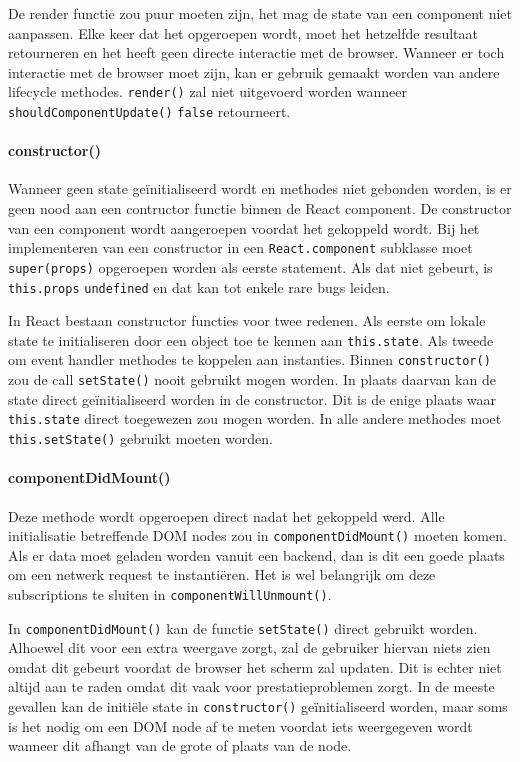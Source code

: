 De render functie zou puur moeten zijn, het mag de state van een component niet aanpassen. Elke keer dat het opgeroepen wordt, moet het hetzelfde resultaat retourneren en het heeft geen directe interactie met de browser. Wanneer er toch interactie met de browser moet zijn, kan er gebruik gemaakt worden van andere lifecycle methodes. \texttt{render()} zal niet uitgevoerd worden wanneer \texttt{shouldComponentUpdate()} \texttt{false} retourneert. \autocite{React2019d}

\paragraph{constructor()}

Wanneer geen state geïnitialiseerd wordt en methodes niet gebonden worden, is er geen nood aan een contructor functie binnen de React component. De constructor van een component wordt aangeroepen voordat het gekoppeld wordt. Bij het implementeren van een constructor in een \texttt{React.component} subklasse moet \texttt{super(props)} opgeroepen worden als eerste statement. Als dat niet gebeurt, is \texttt{this.props} \texttt{undefined} en dat kan tot enkele rare bugs leiden. \autocite{React2019d}

In React bestaan constructor functies voor twee redenen. Als eerste om lokale state te initialiseren door een object toe te kennen aan \texttt{this.state}. Als tweede om event handler methodes te koppelen aan instanties. Binnen \texttt{constructor()} zou de call \texttt{setState()} nooit gebruikt mogen worden. In plaats daarvan kan de state direct geïnitialiseerd worden in de constructor. Dit is de enige plaats waar \texttt{this.state} direct toegewezen zou mogen worden. In alle andere methodes moet \texttt{this.setState()} gebruikt moeten worden. \autocite{React2019d}

\paragraph{componentDidMount()} 

Deze methode wordt opgeroepen direct nadat het gekoppeld werd. Alle initialisatie betreffende DOM nodes zou in \texttt{componentDidMount()} moeten komen. Als er data moet geladen worden vanuit een backend, dan is dit een goede plaats om een netwerk request te instantiëren. Het is wel belangrijk om deze subscriptions te sluiten in \texttt{componentWillUnmount()}. \autocite{React2019d}

In \texttt{componentDidMount()} kan de functie \texttt{setState()} direct gebruikt worden. Alhoewel dit voor een extra weergave zorgt, zal de gebruiker hiervan niets zien omdat dit gebeurt voordat de browser het scherm zal updaten. Dit is echter niet altijd aan te raden omdat dit vaak voor prestatieproblemen zorgt. In de meeste gevallen kan de initiële state in \texttt{constructor()} geïnitialiseerd worden, maar soms is het nodig om een DOM node af te meten voordat iets weergegeven wordt wanneer dit afhangt van de grote of plaats van de node. \autocite{React2019d}

